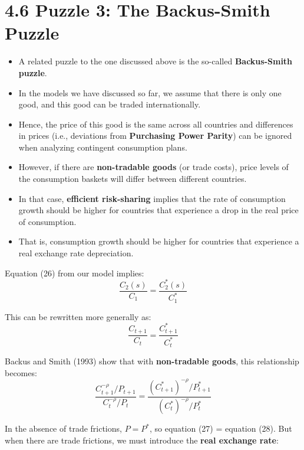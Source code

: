 \documentclass[12pt]{article}
\begin{document}
\section*{\noindent\textbf{4.6 Puzzle 3: The Backus-Smith Puzzle}}

\begin{itemize}
    \item A related puzzle to the one discussed above is the so-called \textbf{Backus-Smith puzzle}.
    \item In the models we have discussed so far, we assume that there is only one good, and this good can be traded internationally.
    \item Hence, the price of this good is the same across all countries and differences in prices (i.e., deviations from \textbf{Purchasing Power Parity}) can be ignored when analyzing contingent consumption plans.
    \item However, if there are \textbf{non-tradable goods} (or trade costs), price levels of the consumption baskets will differ between different countries.
    \item In that case, \textbf{efficient risk-sharing} implies that the rate of consumption growth should be higher for countries that experience a drop in the real price of consumption.
    \item That is, consumption growth should be higher for countries that experience a real exchange rate depreciation.
\end{itemize}

\vspace{1em}
Equation (26) from our model implies:
\[
\frac{C_2(s)}{C_1} = \frac{C_2^*(s)}{C_1^*}
\]

This can be rewritten more generally as:
\begin{equation}
\frac{C_{t+1}}{C_t} = \frac{C_{t+1}^*}{C_t^*} \tag{27}
\end{equation}

Backus and Smith (1993) show that with \textbf{non-tradable goods}, this relationship becomes:
\begin{equation}
\frac{C_{t+1}^{-\rho}/P_{t+1}}{C_t^{-\rho}/P_t} = \frac{(C_{t+1}^*)^{-\rho}/P_{t+1}^*}{(C_t^*)^{-\rho}/P_t^*} \tag{28}
\end{equation}

\noindent
In the absence of trade frictions, \( P = P^* \), so equation (27) = equation (28). But when there are trade frictions, we must introduce the \textbf{real exchange rate}:
\end{document}
